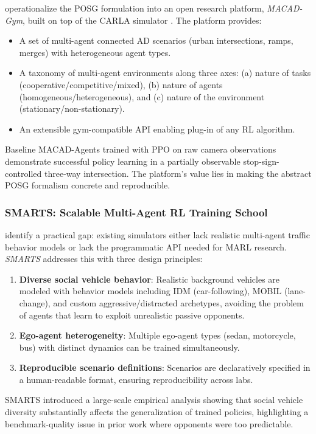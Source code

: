 \documentclass[12pt, a4paper]{article}
\begin{document}
\citet{palanisamy2020multi} operationalize the POSG formulation into an open
research platform, \emph{MACAD-Gym}, built on top of the CARLA simulator
\citep{dosovitskiy2017carlaopenurbandriving}. The platform provides:
\begin{itemize}[noitemsep]
  \item A set of multi-agent connected AD scenarios (urban intersections, ramps,
        merges) with heterogeneous agent types.
  \item A taxonomy of multi-agent environments along three axes: (a) nature of
        tasks (cooperative/competitive/mixed), (b) nature of agents
        (homogeneous/heterogeneous), and (c) nature of the environment
        (stationary/non-stationary).
  \item An extensible gym-compatible API enabling plug-in of any RL algorithm.
\end{itemize}
Baseline MACAD-Agents trained with PPO on raw camera observations demonstrate
successful policy learning in a partially observable stop-sign-controlled
three-way intersection. The platform's value lies in making the abstract POSG
formalism concrete and reproducible.

\subsubsection{SMARTS: Scalable Multi-Agent RL Training School}
\label{sec:smarts}

\citet{zhou2020smarts} identify a practical gap: existing simulators either lack
realistic multi-agent traffic behavior models or lack the programmatic API needed
for MARL research. \emph{SMARTS} addresses this with three design principles:
\begin{enumerate}[noitemsep]
  \item \textbf{Diverse social vehicle behavior}: Realistic background vehicles are
        modeled with behavior models including IDM (car-following), MOBIL
        (lane-change), and custom aggressive/distracted archetypes, avoiding the
        problem of agents that learn to exploit unrealistic passive opponents.
  \item \textbf{Ego-agent heterogeneity}: Multiple ego-agent types (sedan,
        motorcycle, bus) with distinct dynamics can be trained simultaneously.
  \item \textbf{Reproducible scenario definitions}: Scenarios are declaratively
        specified in a human-readable format, ensuring reproducibility across labs.
\end{enumerate}
SMARTS introduced a large-scale empirical analysis showing that social vehicle
diversity substantially affects the generalization of trained policies, highlighting
a benchmark-quality issue in prior work where opponents were too predictable.
\end{document}

